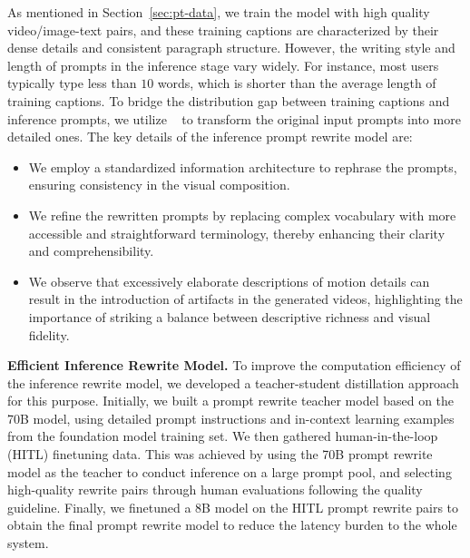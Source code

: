 As mentioned in Section~\ref{sec:pt-data}, we train the model with high quality video/image-text pairs, and these training captions are characterized by their dense details and consistent paragraph structure.
However, the writing style and length of prompts in the inference stage vary widely.
For instance, most users typically type less than $10$ words, which is shorter than the average length of training captions.
To bridge the distribution gap between training captions and inference prompts, we utilize \llama~\citep{llama3} to transform the original input prompts into more detailed ones. The key details of the inference prompt rewrite model are:
\begin{itemize}
    \item We employ a standardized information architecture to rephrase the prompts, ensuring consistency in the visual composition.
    \item We refine the rewritten prompts by replacing complex vocabulary with more accessible and straightforward terminology, thereby enhancing their clarity and comprehensibility.
    \item We observe that excessively elaborate descriptions of motion details can result in the introduction of artifacts in the generated videos, highlighting the importance of striking a balance between descriptive richness and visual fidelity.
\end{itemize}



\textbf{Efficient Inference Rewrite Model.}
To improve the computation efficiency of the inference rewrite model, we developed a teacher-student distillation approach for this purpose.
Initially, we built a prompt rewrite teacher model based on the \llama 70B model, using detailed prompt instructions and in-context learning examples from the foundation model training set.
We then gathered human-in-the-loop (HITL) finetuning data.
This was achieved by using the \llama 70B prompt rewrite model as the teacher to conduct inference on a large prompt pool, and selecting high-quality rewrite pairs through human evaluations following the quality guideline.
Finally, we finetuned a 8B \llama model on the HITL prompt rewrite pairs to obtain the final prompt rewrite model to reduce the latency burden to the whole system.

